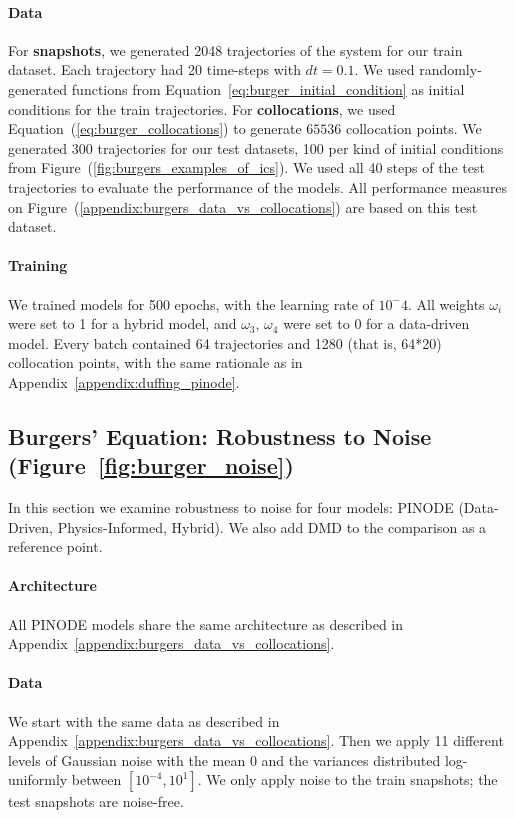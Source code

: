\paragraph{Data} For \textbf{snapshots}, we generated 2048 trajectories of the system for our train dataset. Each trajectory had 20 time-steps with $dt = 0.1$. We used randomly-generated functions from Equation~\ref{eq:burger_initial_condition} as initial conditions for the train trajectories. 
For \textbf{collocations}, we used Equation~(\ref{eq:burger_collocations}) to generate $65536$ collocation points. 
We generated 300 trajectories for our test datasets, 100 per kind of initial conditions from Figure~(\ref{fig:burgers_examples_of_ics}). We used all 40 steps of the test trajectories to evaluate the performance of the models. All performance measures on Figure~(\ref{appendix:burgers_data_vs_collocations}) are based on this test dataset.


\paragraph{Training} We trained models for 500 epochs, with the learning rate of $10^-4$. All weights $\omega_i$ were set to 1 for a hybrid model, and $\omega_3$, $\omega_4$ were set to 0 for a data-driven model. Every batch contained 64 trajectories and 1280 (that is, 64*20) collocation points, with the same rationale as in Appendix~\ref{appendix:duffing_pinode}.

\subsection{Burgers' Equation: Robustness to Noise (Figure~\ref{fig:burger_noise})}
In this section we examine robustness to noise for four models: PINODE (Data-Driven, Physics-Informed, Hybrid). We also add DMD to the comparison as a reference point.
\label{appendix:burgers_noise}
\paragraph{Architecture} All PINODE models share the same architecture as described in Appendix~\ref{appendix:burgers_data_vs_collocations}.

\paragraph{Data} We start with the same data as described in Appendix~\ref{appendix:burgers_data_vs_collocations}. Then we apply 11 different levels of Gaussian noise with the mean 0 and the variances distributed log-uniformly between $[10^{-4}, 10^1]$. We only apply noise to the train snapshots; the test snapshots are noise-free. 

